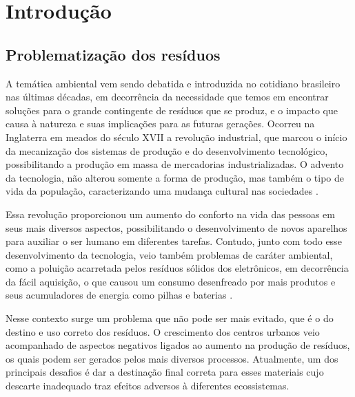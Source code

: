 \documentclass[
	12pt,				%
	openany,			%
	twoside,			%
	a4paper,			%
	english,			%
	french,				%
	spanish,			%
	brazil				%
	]{abntex2}
\begin{document}


\tableofcontents*
\cleardoublepage




\textual





\chapter{Introdução}
\section{Problematização dos resíduos}
A temática ambiental vem sendo debatida e introduzida no cotidiano brasileiro nas últimas décadas, em decorrência da necessidade que temos em encontrar soluções para o grande contingente de resíduos que se produz, e o impacto que causa à natureza e suas implicações para as futuras gerações.
Ocorreu na Inglaterra em meados do século XVII a revolução industrial, que marcou o início da mecanização dos sistemas de produção e do desenvolvimento tecnológico, possibilitando a produção em massa de mercadorias industrializadas. O advento da tecnologia, não alterou somente a forma de produção, mas também o tipo de vida da população, caracterizando uma mudança cultural nas sociedades \cite{aftc}.

Essa revolução proporcionou um aumento do conforto na vida das pessoas em seus mais diversos aspectos, possibilitando o desenvolvimento de novos aparelhos para auxiliar o ser humano em diferentes tarefas. Contudo, junto com todo esse desenvolvimento da tecnologia, veio também problemas de caráter ambiental, como a poluição acarretada pelos resíduos sólidos dos eletrônicos, em decorrência da fácil aquisição, o que causou um consumo desenfreado por mais produtos e seus acumuladores de energia como pilhas e baterias \cite{rqne}.

Nesse contexto surge um problema que não pode ser mais evitado, que é o do destino e uso correto dos resíduos. O crescimento dos centros urbanos veio acompanhado de aspectos negativos ligados ao aumento na produção de resíduos, os quais podem ser gerados pelos mais diversos processos. Atualmente, um dos principais desafios é dar a destinação final correta para esses materiais cujo descarte inadequado traz efeitos adversos à diferentes ecossistemas.
\end{document}
